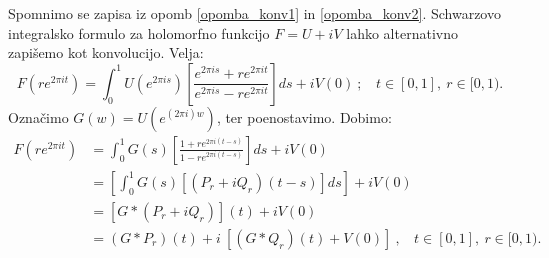 \documentclass[mat1]{fmfdelo}
\begin{document}
    \begin{opomba}
        Spomnimo se zapisa iz opomb \ref{opomba_konv1} in \ref{opomba_konv2}. Schwarzovo integralsko formulo za holomorfno funkcijo $F = U + iV$ lahko alternativno zapišemo kot konvolucijo. Velja:
        $$
            F(r e^{2 \pi i t}) = \int_{0}^{1}{U(e^{2 \pi i s})\left[\frac{e^{2 \pi i s}+r e^{2 \pi i t}}{e^{2 \pi i s}-r e^{2 \pi it}}\right]ds} + i V(0)~;~~~~t \in [0,1],~r \in [0,1).
        $$
        Označimo $G(w) = U(e^{(2 \pi i) w})$, ter poenostavimo. Dobimo:
        \begin{align*}
            F(r e^{2 \pi i t}) & = \int_{0}^{1}{G(s)\left[\frac{1 +r e^{2 \pi i (t-s)}}{1-r e^{2 \pi i(t-s)}}\right]}ds + iV(0)\\
            & = \left[\int_{0}^{1}{G(s)[(P_r + i Q_r)(t - s)]}ds\right]+  iV(0) \\
            & = \left[G * (P_r + iQ_r)\right](t) + iV(0)\\
            & = (G * P_r)(t) + i~[(G * Q_r)(t) + V(0)]~,~~~~t\in [0,1],~r \in [0,1).
        \end{align*}
    \end{opomba}
\end{document}
